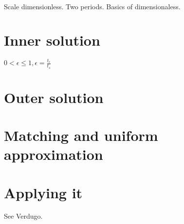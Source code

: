 \documentclass[12pt]{report}
\begin{document}
Scale dimensionless. Two periods. Basics of dimensionaless.

\section{Inner solution}

$0 < \epsilon \leq 1, \epsilon = \frac{t_{\epsilon}}{t_{s}}$

\section{Outer solution}

\section{Matching and uniform approximation}

\section{Applying it}

See Verdugo.


\end{document}
